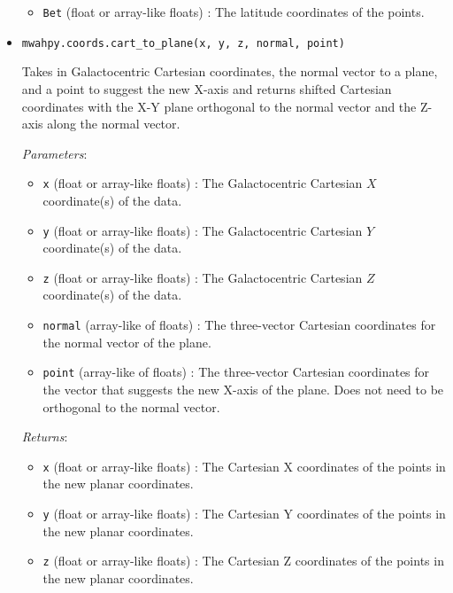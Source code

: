 \documentclass{article}
\begin{document}
\begin{itemize}
\begin{itemize}
\item \verb!Bet! (float or array-like floats) : The latitude coordinates of the points.

\end{itemize}



\item \verb!mwahpy.coords.cart_to_plane(x, y, z, normal, point)!

Takes in Galactocentric Cartesian coordinates, the normal vector to a plane, and a point to suggest the new X-axis and returns shifted Cartesian coordinates with the X-Y plane orthogonal to the normal vector and the Z-axis along the normal vector. 

\textit{Parameters}: \begin{itemize}

\item \verb!x! (float or array-like floats) : The Galactocentric Cartesian $X$ coordinate(s) of the data.

\item \verb!y! (float or array-like floats) : The Galactocentric Cartesian $Y$ coordinate(s) of the data.

\item \verb!z! (float or array-like floats) : The Galactocentric Cartesian $Z$ coordinate(s) of the data.

\item \verb!normal! (array-like of floats) : The three-vector Cartesian coordinates for the normal vector of the plane.

\item \verb!point! (array-like of floats) : The three-vector Cartesian coordinates for the vector that suggests the new X-axis of the plane. Does not need to be orthogonal to the normal vector.

\end{itemize}

\textit{Returns}: \begin{itemize}

\item \verb!x! (float or array-like floats) : The Cartesian X coordinates of the points in the new planar coordinates.

\item \verb!y! (float or array-like floats) : The Cartesian Y coordinates of the points in the new planar coordinates.

\item \verb!z! (float or array-like floats) : The Cartesian Z coordinates of the points in the new planar coordinates.


\end{itemize}
\end{itemize}
\end{document}

